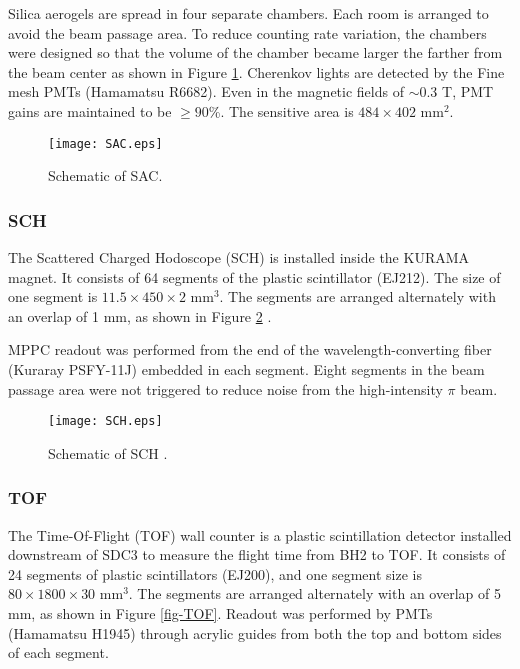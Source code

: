 Silica aerogels are spread in four separate chambers. Each room is arranged to avoid the beam passage area.
To reduce counting rate variation, the chambers were designed so that the volume of the chamber became larger the farther from the beam center as shown in Figure \ref{fig-SAC}. Cherenkov lights are detected by the Fine mesh PMTs (Hamamatsu R6682). Even in the magnetic fields of $\sim$0.3 T, PMT gains are maintained to be $\geq90$\%. The sensitive area is $484\times402$ mm$^2$.

\begin{figure}[!h]
 \begin{center}
   \texttt{[image: SAC.eps]}
   \caption{Schematic of SAC.}
   \label{fig-SAC}
 \end{center}
\end{figure}

\subsubsection{SCH}
The Scattered Charged Hodoscope (SCH) is installed inside the KURAMA magnet. It consists of 64 segments of the plastic scintillator (EJ212). The size of one segment is $11.5\times450\times2$ mm$^3$. The segments are arranged alternately with an overlap of 1 mm, as shown in Figure \ref{fig-SCH} \cite{Nana-D}. 

MPPC readout was performed from the end of the wavelength-converting fiber (Kuraray PSFY-11J) embedded in each segment. Eight segments in the beam passage area were not triggered to reduce noise from the high-intensity $\pi$ beam.

\begin{figure}[!h]
 \begin{center}
   \texttt{[image: SCH.eps]}
   \caption{Schematic of SCH \cite{Nana-D}.}
   \label{fig-SCH}
 \end{center}
\end{figure}

%
\subsubsection{TOF}
The Time-Of-Flight (TOF) wall counter is a plastic scintillation detector installed downstream of SDC3 to measure the flight time from BH2 to TOF. It consists of 24 segments of plastic scintillators (EJ200), and one segment size is $80\times1800\times30$ mm$^3$. The segments are arranged alternately with an overlap of 5 mm, as shown in Figure \ref{fig-TOF}. Readout was performed by PMTs (Hamamatsu H1945) through acrylic guides from both the top and bottom sides of each segment. 


